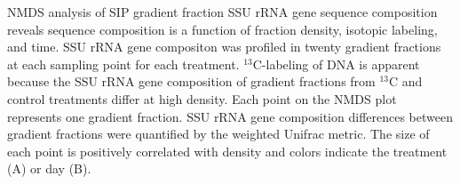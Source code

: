 NMDS analysis of SIP gradient fraction SSU rRNA gene sequence composition reveals
sequence composition is a function of fraction density, isotopic labeling, and
time. SSU rRNA gene compositon was profiled in twenty gradient fractions at each
sampling point for each treatment.  $^{13}$C-labeling of DNA is apparent because the SSU rRNA gene
composition of gradient fractions from $^{13}$C and control treatments differ
at high density. Each point on the NMDS plot represents one gradient fraction.
SSU rRNA gene composition differences between gradient fractions were
quantified by the weighted Unifrac metric. The size of each point is positively
correlated with density and colors indicate the treatment (A) or day (B).
